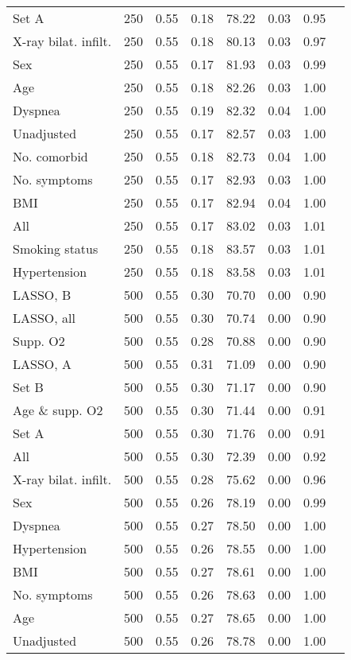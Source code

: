\documentclass{article}
\begin{document}
{\begin{longtable}{lccccccc}
Set A & 250 & 0.55 & 0.18 & 78.22 & 0.03 & 0.95\\
X-ray bilat. infilt. & 250 & 0.55 & 0.18 & 80.13 & 0.03 & 0.97\\
Sex & 250 & 0.55 & 0.17 & 81.93 & 0.03 & 0.99\\
Age & 250 & 0.55 & 0.18 & 82.26 & 0.03 & 1.00\\
Dyspnea & 250 & 0.55 & 0.19 & 82.32 & 0.04 & 1.00\\
Unadjusted & 250 & 0.55 & 0.17 & 82.57 & 0.03 & 1.00\\
No. comorbid & 250 & 0.55 & 0.18 & 82.73 & 0.04 & 1.00\\
No. symptoms & 250 & 0.55 & 0.17 & 82.93 & 0.03 & 1.00\\
BMI & 250 & 0.55 & 0.17 & 82.94 & 0.04 & 1.00\\
All & 250 & 0.55 & 0.17 & 83.02 & 0.03 & 1.01\\
Smoking status & 250 & 0.55 & 0.18 & 83.57 & 0.03 & 1.01\\
Hypertension & 250 & 0.55 & 0.18 & 83.58 & 0.03 & 1.01\\ \midrule
LASSO, B & 500 & 0.55 & 0.30 & 70.70 & 0.00 & 0.90\\
LASSO, all & 500 & 0.55 & 0.30 & 70.74 & 0.00 & 0.90\\
Supp. O2 & 500 & 0.55 & 0.28 & 70.88 & 0.00 & 0.90\\
LASSO, A & 500 & 0.55 & 0.31 & 71.09 & 0.00 & 0.90\\
Set B & 500 & 0.55 & 0.30 & 71.17 & 0.00 & 0.90\\
Age \& supp. O2 & 500 & 0.55 & 0.30 & 71.44 & 0.00 & 0.91\\
Set A & 500 & 0.55 & 0.30 & 71.76 & 0.00 & 0.91\\
All & 500 & 0.55 & 0.30 & 72.39 & 0.00 & 0.92\\
X-ray bilat. infilt. & 500 & 0.55 & 0.28 & 75.62 & 0.00 & 0.96\\
Sex & 500 & 0.55 & 0.26 & 78.19 & 0.00 & 0.99\\
Dyspnea & 500 & 0.55 & 0.27 & 78.50 & 0.00 & 1.00\\
Hypertension & 500 & 0.55 & 0.26 & 78.55 & 0.00 & 1.00\\
BMI & 500 & 0.55 & 0.27 & 78.61 & 0.00 & 1.00\\
No. symptoms & 500 & 0.55 & 0.26 & 78.63 & 0.00 & 1.00\\
Age & 500 & 0.55 & 0.27 & 78.65 & 0.00 & 1.00\\
Unadjusted & 500 & 0.55 & 0.26 & 78.78 & 0.00 & 1.00\\

\end{longtable}}
\end{document}
